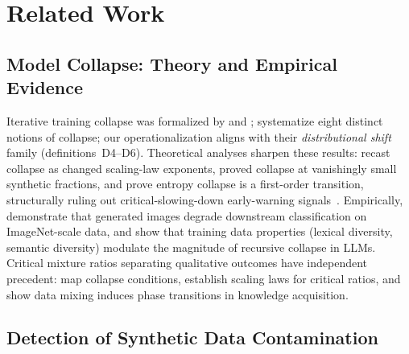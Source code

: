 \section{Related Work}
\label{sec:related_work}

\subsection{Model Collapse: Theory and Empirical Evidence}
\label{sec:rw_collapse}

Iterative training collapse was formalized by \citet{shumailov2024curse} and \citet{alemohammad2024mad}; \citet{schaeffer2025position} systematize eight distinct notions of collapse; our operationalization aligns with their \emph{distributional shift} family (definitions~D4--D6).
Theoretical analyses sharpen these results: \citet{dohmatob2024tale} recast collapse as changed scaling-law exponents, \citet{dohmatob2025strong} proved collapse at vanishingly small synthetic fractions, and \citet{truong2026phase} prove entropy collapse is a first-order transition, structurally ruling out critical-slowing-down early-warning signals~\citep{scheffer2009early,scheffer2012anticipating}.
Empirically, \citet{hataya2023will} demonstrate that generated images degrade downstream classification on ImageNet-scale data, and \citet{kovac2025recursive} show that training data properties (lexical diversity, semantic diversity) modulate the magnitude of recursive collapse in LLMs.
Critical mixture ratios separating qualitative outcomes have independent precedent: \citet{kazdan2025collapse} map collapse conditions, \citet{gu2024cmr} establish scaling laws for critical ratios, and \citet{gu2025datamixing} show data mixing induces phase transitions in knowledge acquisition.

\subsection{Detection of Synthetic Data Contamination}
\label{sec:rw_detection}

